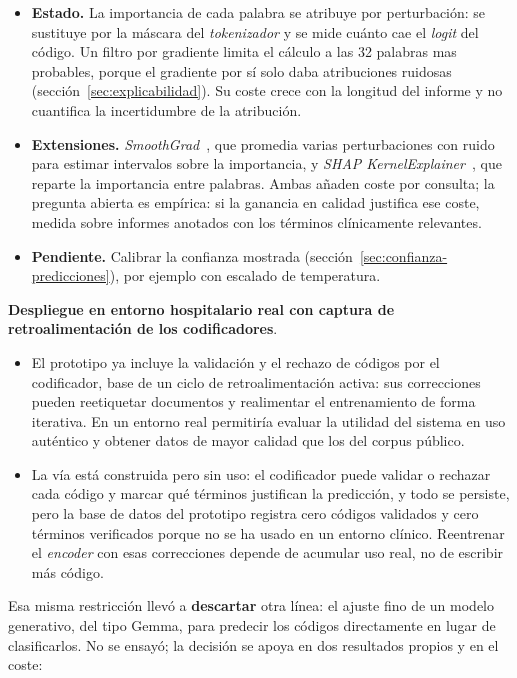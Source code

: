 \begin{itemize}
 \item \textbf{Estado.} La importancia de cada palabra se atribuye por perturbación: se sustituye por la máscara del \emph{tokenizador} y se mide cuánto cae el \emph{logit} del código. Un filtro por gradiente limita el cálculo a las 32 palabras mas probables, porque el gradiente por sí solo daba atribuciones ruidosas (sección~\ref{sec:explicabilidad}). Su coste crece con la longitud del informe y no cuantifica la incertidumbre de la atribución.
 \item \textbf{Extensiones.} \emph{SmoothGrad}~\cite{Smilkov17}, que promedia varias perturbaciones con ruido para estimar intervalos sobre la importancia, y \emph{SHAP KernelExplainer}~\cite{Lundberg17}, que reparte la importancia entre palabras. Ambas añaden coste por consulta; la pregunta abierta es empírica: si la ganancia en calidad justifica ese coste, medida sobre informes anotados con los términos clínicamente relevantes.
 \item \textbf{Pendiente.} Calibrar la confianza mostrada (sección~\ref{sec:confianza-predicciones}), por ejemplo con escalado de temperatura.
\end{itemize}

\textbf{Despliegue en entorno hospitalario real con captura de retroalimentación de los codificadores}.

\begin{itemize}
 \item El prototipo ya incluye la validación y el rechazo de códigos por el codificador, base de un ciclo de retroalimentación activa: sus correcciones pueden reetiquetar documentos y realimentar el entrenamiento de forma iterativa. En un entorno real permitiría evaluar la utilidad del sistema en uso auténtico y obtener datos de mayor calidad que los del corpus público.
 \item La vía está construida pero sin uso: el codificador puede validar o rechazar cada código y marcar qué términos justifican la predicción, y todo se persiste, pero la base de datos del prototipo registra cero códigos validados y cero términos verificados porque no se ha usado en un entorno clínico. Reentrenar el \emph{encoder} con esas correcciones depende de acumular uso real, no de escribir más código.
\end{itemize}

Esa misma restricción llevó a \textbf{descartar} otra línea: el ajuste fino de un modelo generativo, del tipo Gemma, para predecir los códigos directamente en lugar de clasificarlos. No se ensayó; la decisión se apoya en dos resultados propios y en el coste:

